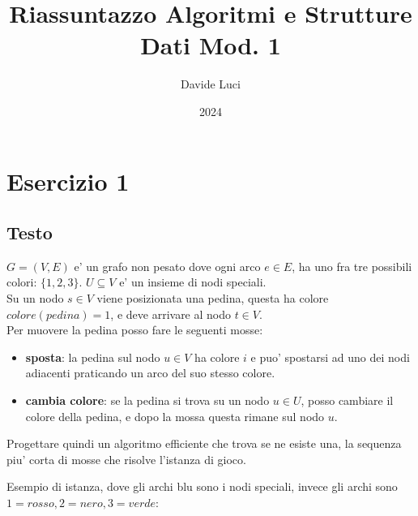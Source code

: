 \documentclass{article}
\title{Riassuntazzo Algoritmi e Strutture Dati Mod. 1}
\author{Davide Luci}
\date{2024}
\begin{document}
    \maketitle
    \newpage

    \section{Esercizio 1}
    \subsection{Testo}
    $G=(V,E)$ e' un grafo non pesato dove ogni arco $e \in E$, 
    ha uno fra tre possibili colori: $\{1,2,3\}$. $U \subseteq V$ e' un insieme
    di nodi speciali. \\
    Su un nodo $s \in V$ viene posizionata una pedina, questa ha colore $colore(pedina) = 1$, e deve arrivare al nodo $t \in V$. \\

    Per muovere la pedina posso fare le seguenti mosse:
    \begin{itemize}
        \item \textbf{sposta}: la pedina sul nodo $u \in V$ ha colore $i$ e puo' spostarsi
        ad uno dei nodi adiacenti praticando un arco del suo stesso colore.
        \item \textbf{cambia colore}: se la pedina si trova su un nodo $u \in U$, posso cambiare il colore
        della pedina, e dopo la mossa questa rimane sul nodo $u$.
    \end{itemize}

    Progettare quindi un algoritmo efficiente che trova se ne esiste una, la sequenza
    piu' corta di mosse che risolve l'istanza di gioco.

    Esempio di istanza, dove gli archi blu sono i nodi speciali, invece gli archi sono $1=rosso, 2=nero, 3=verde$:
    

\end{document}
